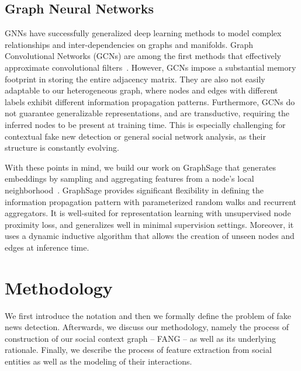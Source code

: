 \documentclass[sigconf]{acmart}
\theoremstyle{definition}
\theoremstyle{hypothesis}
\begin{document}
\subsection{Graph Neural Networks}
GNNs have successfully generalized deep learning methods to model complex relationships and inter-dependencies on graphs and manifolds. Graph Convolutional Networks (GCNs) are among the first methods that effectively approximate convolutional filters~\cite{kipf2016semi}. However, GCNs impose a substantial memory footprint in storing the entire adjacency matrix.  They are also not easily adaptable to our heterogeneous graph, where nodes and edges with different labels exhibit different information propagation patterns. Furthermore, GCNs do not guarantee generalizable representations, and are transductive, requiring the inferred nodes to be present at training time. This is especially challenging for contextual fake new detection or general social network analysis, as their structure is constantly evolving.

With these points in mind, we build our work on GraphSage that generates embeddings by sampling and aggregating features from a node's local neighborhood~\cite{Hamilton2017InductiveRL}. 
GraphSage provides significant flexibility in defining the information propagation pattern with parameterized random walks and recurrent aggregators. It is well-suited for representation learning with unsupervised node proximity loss, and generalizes well in minimal supervision settings. Moreover, it uses a dynamic inductive algorithm that allows the creation of unseen nodes and edges at inference time.

\section{Methodology}

We first introduce the notation and then we formally define the problem of fake news detection. Afterwards, we discuss our methodology, namely the process of construction of our social context graph -- FANG -- as well as its underlying rationale. 
Finally, we describe the process of feature extraction from social entities as well as the modeling of their interactions. 
\end{document}
